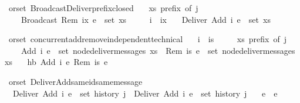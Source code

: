 \begin{isabellebody}
\isamarkupfalse%
\ {\isacharparenleft}\ orset{\isacharparenright}\ Broadcast{\isacharunderscore}Deliver{\isacharunderscore}prefix{\isacharunderscore}closed{}{\isacharcolon}\isanewline
\ \ \ {\isachardoublequoteopen}xs\ prefix\ of\ j{\isachardoublequoteclose}\isanewline
\ \ \ \ \ {\isachardoublequoteopen}Broadcast\ {\isacharparenleft}Rem\ ix\ e{\isacharparenright}\ {\isasymin}\ set\ xs{\isachardoublequoteclose}\isanewline
\ \ \ \ \ {\isachardoublequoteopen}i\ {\isasymin}\ ix{\isachardoublequoteclose}\isanewline
\ \ \ {\isachardoublequoteopen}Deliver\ {\isacharparenleft}Add\ i\ e{\isacharparenright}\ {\isasymin}\ set\ xs{\isachardoublequoteclose}\isanewline
\end{isabellebody}

\begin{isabellebody}
\isamarkupfalse%
\ {\isacharparenleft}\ orset{\isacharparenright}\ concurrent{\isacharunderscore}add{\isacharunderscore}remove{\isacharunderscore}independent{\isacharunderscore}technical{\isacharcolon}\isanewline
\ \ \ {\isachardoublequoteopen}i\ {\isasymin}\ is{\isachardoublequoteclose}\isanewline
\ \ \ \ \ {\isachardoublequoteopen}xs\ prefix\ of\ j{\isachardoublequoteclose}\isanewline
\ \ \ \ \ {\isachardoublequoteopen}Add\ i\ e\ {\isasymin}\ set\ {\isacharparenleft}node{\isacharunderscore}deliver{\isacharunderscore}messages\ xs{\isacharparenright}{\isachardoublequoteclose}\ \ {\isachardoublequoteopen}Rem\ is\ e\ {\isasymin}\ set\ {\isacharparenleft}node{\isacharunderscore}deliver{\isacharunderscore}messages\ xs{\isacharparenright}{\isachardoublequoteclose}\isanewline
\ \ \ {\isachardoublequoteopen}hb\ {\isacharparenleft}Add\ i\ e{\isacharparenright}\ {\isacharparenleft}Rem\ is\ e{\isacharparenright}{\isachardoublequoteclose}\isanewline
\end{isabellebody}

\begin{isabellebody}
\isamarkupfalse%
\ {\isacharparenleft}\ orset{\isacharparenright}\ Deliver{\isacharunderscore}Add{\isacharunderscore}same{\isacharunderscore}id{\isacharunderscore}same{\isacharunderscore}message{\isacharcolon}\isanewline
\ \ \ {\isachardoublequoteopen}Deliver\ {\isacharparenleft}Add\ i\ e{}{\isacharparenright}\ {\isasymin}\ set\ {\isacharparenleft}history\ j{\isacharparenright}{\isachardoublequoteclose}\ \ {\isachardoublequoteopen}Deliver\ {\isacharparenleft}Add\ i\ e{}{\isacharparenright}\ {\isasymin}\ set\ {\isacharparenleft}history\ j{\isacharparenright}{\isachardoublequoteclose}\isanewline
\ \ \ {\isachardoublequoteopen}e{}\ {\isacharequal}\ e{}{\isachardoublequoteclose}\isanewline
\end{isabellebody}


